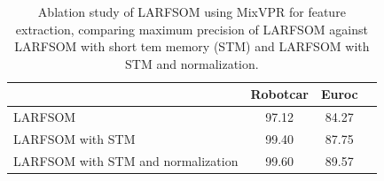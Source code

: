 \begin{table}[t]
\centering
\caption{Ablation study of LARFSOM using MixVPR for feature extraction, comparing maximum precision of LARFSOM against LARFSOM with short tem memory (STM) and LARFSOM with STM and normalization.}
\label{tab:ablation}
\begin{tabular}{lccc}
\hline
\textbf{} & \textbf{Robotcar} & \textbf{Euroc} \\
\hline
LARFSOM          & 97.12 & 84.27 \\

LARFSOM with STM   & 99.40 & 87.75 \\
LARFSOM with STM and normalization & 99.60 & 89.57 \\

\hline
\end{tabular}

\end{table}

